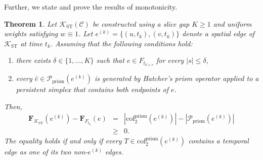\documentclass[
    pre,
    twocolumn,
    superscriptaddress,
    showpacs,
    nofootinbib,
    amsmath,
    amssymb,
    floatfix
]{revtex4-2}
\newcommand{\K}{\mathcal{K}}
\newcommand{\F}{\mathbf{F}}        %
\theoremstyle{plain} %
\newtheorem{theorem}{\indent Theorem} %
\theoremstyle{definition} %
\begin{document}
Further, we state and prove the results of monotonicity.

\begin{theorem}\label{prop:monotonicity}
Let $\K_{\mathrm{ST}}(\mathcal{C})$ be constructed using a slice gap $K \ge 1$ and uniform weights satisfying $w \equiv 1$.
Let $e^{(k)} = \{(u, t_k), (v, t_k)\}$ denote a spatial edge of $\K_{\mathrm{ST}}$ at time $t_k$.
Assuming that the following conditions hold:
\begin{enumerate}
\item[\textnormal{(A1)}] there exists $\delta \in \{1, \ldots, K\}$ such that $e \in F_{t_{k+s}}$ for every $|s| \le \delta$,
\item[\textnormal{(A2)}] every $\hat e \in \mathcal{P}_{\mathrm{prism}}(e^{(k)})$ is generated by Hatcher's prism operator applied to a persistent simplex that contains both endpoints of $e$.
\end{enumerate}
Then,
\begin{eqnarray}\label{eq:monotonicity_main}
\F_{\K_{\mathrm{ST}}}(e^{(k)}) - \F_{F_{t_k}}(e)
&=& |\mathrm{cof}_2^{\mathrm{prism}}(e^{(k)})| - |\mathcal{P}_{\mathrm{prism}}(e^{(k)})|\nonumber\\
&\ge& 0.
\end{eqnarray}
The equality holds if and only if every $T \in \mathrm{cof}_2^{\mathrm{prism}}(e^{(k)})$ contains a temporal edge as one of its two non-$e^{(k)}$ edges.
\end{theorem}
\end{document}

